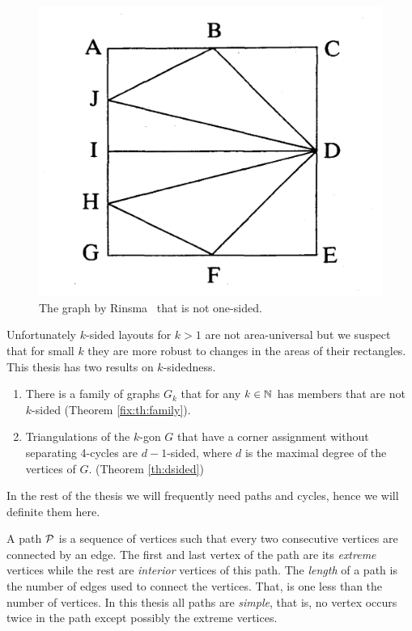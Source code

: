  \begin{figure}[!t]
    \centering
    \includegraphics[scale=.15]{introduction/img/rinsma.png}
    \caption{The graph by Rinsma~\cite{Rinsma1987} that is not one-sided.}
    \label{fig:intro:rinsma}
  \end{figure}






  Unfortunately $k$-sided layouts for $k>1$ are not area-universal but we suspect that for small $k$ they are more robust to changes in the areas of their rectangles. This thesis has two results on $k$-sidedness.
  \begin{enumerate}
    \item There is a family of graphs $G_k$ that for any $k \in \N$ has members that are not $k$-sided (Theorem \ref{fix:th:family}).
    \item Triangulations of the $k$-gon $G$ that have a corner assignment without separating 4-cycles are $d-1$-sided, where $d$ is the maximal degree of the vertices of $G$. (Theorem \ref{th:dsided})
  \end{enumerate}


    In the rest of the thesis we will frequently need paths and cycles, hence we will definite them here.

    A path $\P$ is a sequence of vertices such that every two consecutive vertices are connected by an edge. The first and last vertex of the path are its \emph{extreme} vertices while the rest are \emph{interior} vertices of this path. The \emph{length} of a path is the number of edges used to connect the vertices. That, is one less than the number of vertices. In this thesis all paths are \emph{simple}, that is, no vertex occurs twice in the path except possibly the extreme vertices.

